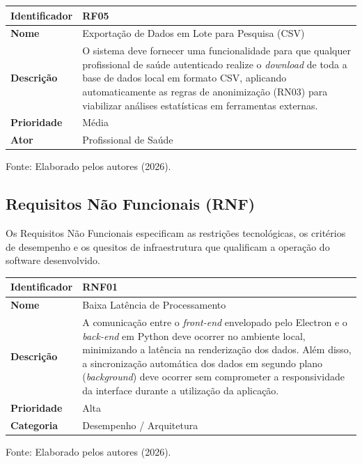 \begin{quadro}[H]
\centering
\caption{Especificação do Requisito Funcional 05 (RF05) - Exportação de Dados em Lote}
\label{quadro:rf05}
\begin{tabular}{|l|p{11cm}|}
\hline
\textbf{Identificador} & \textbf{RF05} \\ \hline
\textbf{Nome} & Exportação de Dados em Lote para Pesquisa (CSV) \\ \hline
\textbf{Descrição} & \raggedright O sistema deve fornecer uma funcionalidade para que qualquer profissional de saúde autenticado realize o \textit{download} de toda a base de dados local em formato CSV, aplicando automaticamente as regras de anonimização (RN03) para viabilizar análises estatísticas em ferramentas externas. \tabularnewline \hline
\textbf{Prioridade} & Média \\ \hline
\textbf{Ator} & Profissional de Saúde \\ \hline
\end{tabular}
\centerline{\footnotesize Fonte: Elaborado pelos autores (2026).}
\end{quadro}

\subsection{Requisitos Não Funcionais (RNF)}
Os Requisitos Não Funcionais especificam as restrições tecnológicas, os critérios de desempenho e os quesitos de infraestrutura que qualificam a operação do software desenvolvido.

\begin{quadro}[H]
\centering
\caption{Especificação do Requisito Não Funcional 01 (RNF01) - Desempenho Local}
\label{quadro:rnf01}
\begin{tabular}{|l|p{11cm}|}
\hline
\textbf{Identificador} & \textbf{RNF01} \\ \hline
\textbf{Nome} & Baixa Latência de Processamento \\ \hline
\textbf{Descrição} & A comunicação entre o \textit{front-end} envelopado pelo Electron e o \textit{back-end} em Python deve ocorrer no ambiente local, minimizando a latência na renderização dos dados. Além disso, a sincronização automática dos dados em segundo plano (\textit{background}) deve ocorrer sem comprometer a responsividade da interface durante a utilização da aplicação. \\ \hline
\textbf{Prioridade} & Alta \\ \hline
\textbf{Categoria} & Desempenho / Arquitetura \\ \hline
\end{tabular}
\centerline{\footnotesize Fonte: Elaborado pelos autores (2026).}
\end{quadro}

